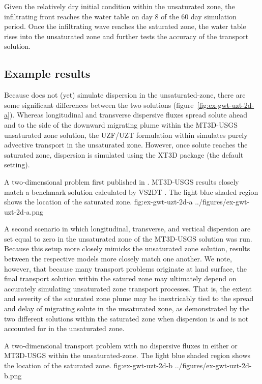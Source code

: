 

Given the relatively dry initial condition within the unsaturated zone, the infiltrating front reaches the water table on day 8 of the 60 day simulation period. Once the infiltrating wave reaches the saturated zone, the water table rises into the unsaturated zone and further tests the accuracy of the transport solution.

\subsection{Example results}

Because \mf does not (yet) simulate dispersion in the unsaturated-zone, there are some significant differences between the two solutions (figure~\ref{fig:ex-gwt-uzt-2d-a}).  Whereas longitudinal and transverse dispersive fluxes spread solute ahead and to the side of the downward migrating plume within the MT3D-USGS unsaturated zone solution, the UZF/UZT formulation within \mf simulates purely advective transport in the unsaturated zone.  However, once solute reaches the saturated zone, dispersion is simulated using the XT3D package (the default setting).  

\begin{StandardFigure}
	{A two-dimensional problem first published in \cite{morway2013}.  MT3D-USGS results closely match a benchmark solution calculated by VS2DT \citep{lappalaetal1987VS2D}.  The light blue shaded region shows the location of the saturated zone.}
	{fig:ex-gwt-uzt-2d-a}
	{../figures/ex-gwt-uzt-2d-a.png}
\end{StandardFigure}

A second scenario in which longitudinal, transverse, and vertical dispersion are set equal to zero in the unsaturated zone of the MT3D-USGS solution was run.  Because this setup more closely mimicks the \mf unsaturated zone solution, results between the respective models more closely match one another.  We note, however, that because many transport problems originate at land surface, the final transport solution within the satured zone may ultimately depend on accurately simulating unsaturated zone transport processes.  That is, the extent and severity of the saturated zone plume may be inextricably tied to the spread and delay of migrating solute in the unsaturated zone, as demonstrated by the two different solutions within the saturated zone when dispersion is and is not accounted for in the unsaturated zone.

\begin{StandardFigure}
	{A two-dimensional transport problem with no dispersive fluxes in either \mf or MT3D-USGS within the unsaturated-zone.  The light blue shaded region shows the location of the saturated zone.}
	{fig:ex-gwt-uzt-2d-b}
	{../figures/ex-gwt-uzt-2d-b.png}
\end{StandardFigure}
